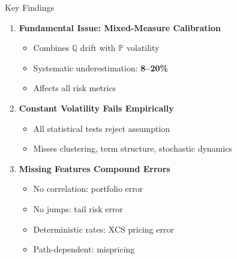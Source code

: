 \documentclass[11pt,aspectratio=169]{beamer}
\begin{document}
	\begin{frame}{Key Findings}
		\begin{enumerate}
			\item \textbf{Fundamental Issue: Mixed-Measure Calibration}
			\begin{itemize}
				\item Combines $\mathbb{Q}$ drift with $\mathbb{P}$ volatility
				\item Systematic underestimation: \textcolor{mufgred}{\textbf{8--20\%}}
				\item Affects all risk metrics
			\end{itemize}
			
			\item \textbf{Constant Volatility Fails Empirically}
			\begin{itemize}
				\item All statistical tests reject assumption
				\item Misses clustering, term structure, stochastic dynamics

			\end{itemize}
			
			\item \textbf{Missing Features Compound Errors}
			\begin{itemize}
				\item No correlation: portfolio error
				\item No jumps:  tail risk error
				\item Deterministic rates: XCS pricing error
				\item Path-dependent:  mispricing
			\end{itemize}
		\end{enumerate}
	\end{frame}
	
\end{document}
